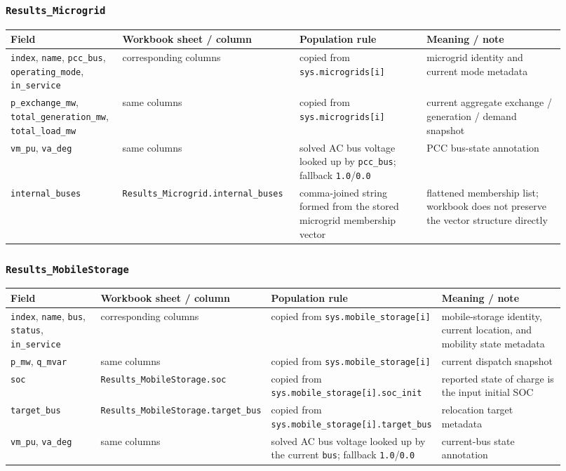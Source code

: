 \subsubsection*{\texttt{Results\_Microgrid}}

\begin{longtable}{@{}L{0.17\linewidth}L{0.29\linewidth}L{0.22\linewidth}L{0.24\linewidth}@{}}
\toprule
Field & Workbook sheet / column & Population rule & Meaning / note \\
\midrule
\endhead
\texttt{index}, \texttt{name}, \texttt{pcc\_bus}, \texttt{operating\_mode}, \texttt{in\_service} & corresponding columns & copied from \texttt{sys.microgrids[i]} & microgrid identity and current mode metadata \\
\texttt{p\_exchange\_mw}, \texttt{total\_generation\_mw}, \texttt{total\_load\_mw} & same columns & copied from \texttt{sys.microgrids[i]} & current aggregate exchange / generation / demand snapshot \\
\texttt{vm\_pu}, \texttt{va\_deg} & same columns & solved AC bus voltage looked up by \texttt{pcc\_bus}; fallback \texttt{1.0}/\texttt{0.0} & PCC bus-state annotation \\
\texttt{internal\_buses} & \texttt{Results\_Microgrid.internal\_buses} & comma-joined string formed from the stored microgrid membership vector & flattened membership list; workbook does not preserve the vector structure directly \\
\bottomrule
\end{longtable}

\subsubsection*{\texttt{Results\_MobileStorage}}

\begin{longtable}{@{}L{0.17\linewidth}L{0.29\linewidth}L{0.22\linewidth}L{0.24\linewidth}@{}}
\toprule
Field & Workbook sheet / column & Population rule & Meaning / note \\
\midrule
\endhead
\texttt{index}, \texttt{name}, \texttt{bus}, \texttt{status}, \texttt{in\_service} & corresponding columns & copied from \texttt{sys.mobile\_storage[i]} & mobile-storage identity, current location, and mobility state metadata \\
\texttt{p\_mw}, \texttt{q\_mvar} & same columns & copied from \texttt{sys.mobile\_storage[i]} & current dispatch snapshot \\
\texttt{soc} & \texttt{Results\_MobileStorage.soc} & copied from \texttt{sys.mobile\_storage[i].soc\_init} & reported state of charge is the input initial SOC \\
\texttt{target\_bus} & \texttt{Results\_MobileStorage.target\_bus} & copied from \texttt{sys.mobile\_storage[i].target\_bus} & relocation target metadata \\
\texttt{vm\_pu}, \texttt{va\_deg} & same columns & solved AC bus voltage looked up by the current \texttt{bus}; fallback \texttt{1.0}/\texttt{0.0} & current-bus state annotation \\
\bottomrule
\end{longtable}

